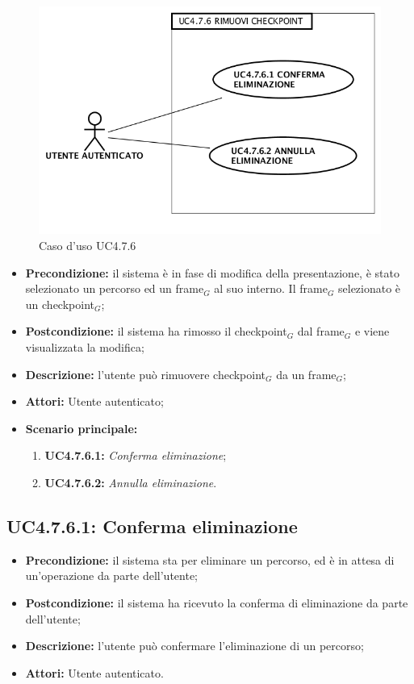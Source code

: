 \begin{figure}[H]
	\begin{center}
	\includegraphics[scale=0.4]{diagram/UC4-7-6.png}
	\caption{Caso d'uso UC4.7.6}
	\end{center}
\end{figure}
\begin{itemize}
	\item \textbf{Precondizione:} il sistema è in fase di modifica della presentazione, è stato selezionato un percorso ed un frame$_G$ al suo interno. Il frame$_G$ selezionato è un checkpoint$_G$;
	\item \textbf{Postcondizione:} il sistema ha rimosso il checkpoint$_G$ dal frame$_G$ e viene visualizzata la modifica;
	\item \textbf{Descrizione:} l'utente può rimuovere checkpoint$_G$ da un frame$_G$;
	\item \textbf{Attori:} Utente autenticato;
	\item \textbf{Scenario principale:}
	\begin{enumerate}
		\item \textbf{ UC4.7.6.1:} \textit{ Conferma eliminazione};
		\item \textbf{ UC4.7.6.2:} \textit{ Annulla eliminazione}.
	\end{enumerate}
\end{itemize}
\subsection{ UC4.7.6.1: Conferma eliminazione}

\begin{itemize}
	\item \textbf{Precondizione:} il sistema sta per eliminare un percorso, ed è in attesa di un'operazione da parte dell'utente;
	\item \textbf{Postcondizione:} il sistema ha ricevuto la conferma di eliminazione da parte dell'utente;
	\item \textbf{Descrizione:} l'utente può confermare l'eliminazione di un percorso;
	\item \textbf{Attori:} Utente autenticato.
\end{itemize}
